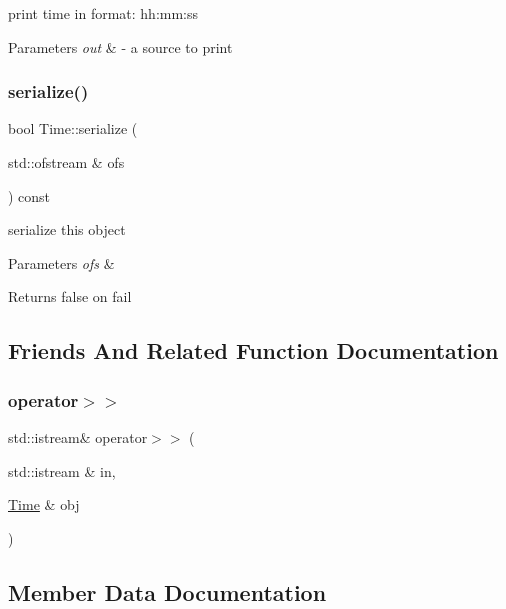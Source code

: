print time in format\+: hh\+:mm\+:ss 
\begin{DoxyParams}{Parameters}
{\em out} & -\/ a source to print \\
\hline
\end{DoxyParams}
\mbox{\label{classTime_acab7dbc13c8a0d9a0f33047d41f4aee0}} 
\subsubsection{\texorpdfstring{serialize()}{serialize()}}
{\footnotesize\ttfamily bool Time\+::serialize (\begin{DoxyParamCaption}\item[{std\+::ofstream \&}]{ofs }\end{DoxyParamCaption}) const}

serialize this object 
\begin{DoxyParams}{Parameters}
{\em ofs} & \\
\hline
\end{DoxyParams}
\begin{DoxyReturn}{Returns}
false on fail 
\end{DoxyReturn}


\subsection{Friends And Related Function Documentation}
\mbox{\label{classTime_ae4ac864187eab9a6a954dd4213ec49fa}} 
\subsubsection{\texorpdfstring{operator$>$$>$}{operator>>}}
{\footnotesize\ttfamily std\+::istream\& operator$>$$>$ (\begin{DoxyParamCaption}\item[{std\+::istream \&}]{in,  }\item[{\hyperlink{classTime}{Time} \&}]{obj }\end{DoxyParamCaption})\hspace{0.3cm}{\ttfamily [friend]}}



\subsection{Member Data Documentation}
\mbox{\label{classTime_aeb625f84f2755479deac3ca3fd1d1cb4}} 
